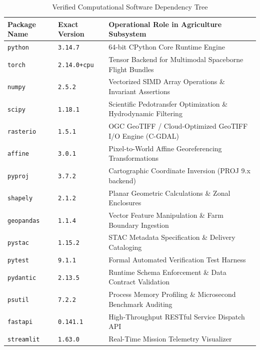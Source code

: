 \documentclass[11pt,a4paper]{article}
\theoremstyle{definition}
\theoremstyle{remark}
\begin{document}
\begin{table}[htbp]
\centering
\caption{Verified Computational Software Dependency Tree}
\label{tab:software_matrix}
\small
\begin{tabular}{lll}
\toprule
\textbf{Package Name} & \textbf{Exact Version} & \textbf{Operational Role in Agriculture Subsystem} \\
\midrule
\texttt{python}       & \texttt{3.14.7}        & 64-bit CPython Core Runtime Engine \\
\texttt{torch}        & \texttt{2.14.0+cpu}    & Tensor Backend for Multimodal Spaceborne Flight Bundles \\
\texttt{numpy}        & \texttt{2.5.2}         & Vectorized SIMD Array Operations \& Invariant Assertions \\
\texttt{scipy}        & \texttt{1.18.1}        & Scientific Pedotransfer Optimization \& Hydrodynamic Filtering \\
\texttt{rasterio}     & \texttt{1.5.1}         & OGC GeoTIFF / Cloud-Optimized GeoTIFF I/O Engine (C-GDAL) \\
\texttt{affine}       & \texttt{3.0.1}         & Pixel-to-World Affine Georeferencing Transformations \\
\texttt{pyproj}       & \texttt{3.7.2}         & Cartographic Coordinate Inversion (PROJ 9.x backend) \\
\texttt{shapely}      & \texttt{2.1.2}         & Planar Geometric Calculations \& Zonal Enclosures \\
\texttt{geopandas}    & \texttt{1.1.4}         & Vector Feature Manipulation \& Farm Boundary Ingestion \\
\texttt{pystac}       & \texttt{1.15.2}        & STAC Metadata Specification \& Delivery Cataloging \\
\texttt{pytest}       & \texttt{9.1.1}         & Formal Automated Verification Test Harness \\
\texttt{pydantic}     & \texttt{2.13.5}        & Runtime Schema Enforcement \& Data Contract Validation \\
\texttt{psutil}       & \texttt{7.2.2}         & Process Memory Profiling \& Microsecond Benchmark Auditing \\
\texttt{fastapi}      & \texttt{0.141.1}       & High-Throughput RESTful Service Dispatch API \\
\texttt{streamlit}    & \texttt{1.63.0}        & Real-Time Mission Telemetry Visualizer \\
\bottomrule
\end{tabular}
\end{table}
\end{document}
